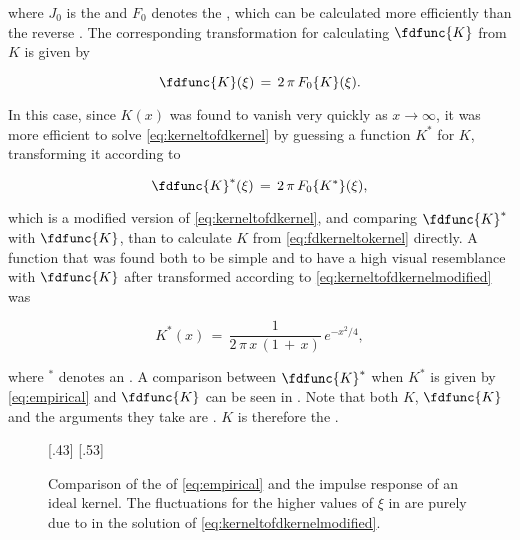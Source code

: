 where $J_0$ is the  and $F_0$ denotes the , which can be calculated more efficiently than the reverse . The corresponding transformation for calculating $\fdfunc{K}$ from $K$ is given by

\begin{equation} \label{eq:kerneltofdkernel}
\fdfunc{K}(\xi) \,=\, 2\,\pi\,F_0\{K\}(\xi).
\end{equation}

In this case, since $K(x)$ was found to vanish very quickly as $x\rightarrow\infty$, it was more efficient to solve \eqref{eq:kerneltofdkernel} by guessing a function $K^*$ for $K$, transforming it according to

\begin{equation} \label{eq:kerneltofdkernelmodified}
\fdfunc{K}^*(\xi) \,=\, 2\,\pi\,F_0\{K^*\}(\xi),
\end{equation}

which is a modified version of \eqref{eq:kerneltofdkernel}, and comparing $\fdfunc{K}^*$ with $\fdfunc{K}$, than to calculate $K$ from \eqref{eq:fdkerneltokernel} directly. A function that was found both to be simple and to have a high visual resemblance with $\fdfunc{K}$ after transformed according to \eqref{eq:kerneltofdkernelmodified} was

\begin{equation} \label{eq:empirical}
K^*(x) \,=\, \frac{1}{2\,\pi\,x\,(1\,+\,x)}\,e^{-x^2/4},
\end{equation}

where $^*$ denotes an \estimate. A comparison between $\fdfunc{K}^*$ when $K^*$ is given by \eqref{eq:empirical} and $\fdfunc{K}$ can be seen in . Note that both $K$, $\fdfunc{K}$ and the arguments they take are . $K$ is therefore the .

\begin{figure}
    \centering
    \subcaptionbox{\label{fig:transformedkernelcomparison}}[.43\textwidth]{}
    \subcaptionbox{\label{fig:transformedkernelratio}}[.53\textwidth]{}
    \caption{Comparison of the  of \eqref{eq:empirical} and the impulse response of an ideal kernel. The fluctuations for the higher values of $\xi$ in  are purely due to  in the solution of \eqref{eq:kerneltofdkernelmodified}.}
    \label{fig:transformedkernel}
\end{figure}

